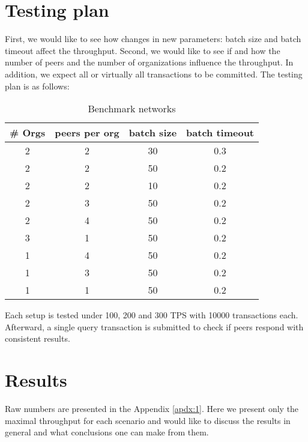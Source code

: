 \section{Testing plan}\label{sec:testplan}

First, we would like to see how changes in new parameters: batch size and batch timeout affect the throughput. Second, we would like to see if and how the number of peers and the number of organizations influence the throughput. In addition, we expect all or virtually all transactions to be committed. The testing plan is as follows:

\begin{table}[h!]
\begin{center}
\begin{tabular}{ c|c|c|c }
  \# Orgs & peers per org & batch size & batch timeout \\
 \hline
 \hline
 2 & 2 & 30 & 0.3 \\
 \hline
 2 & 2 & 50 & 0.2 \\
 \hline
 2 & 2 & 10 & 0.2 \\
 \hline
 2 & 3 & 50 & 0.2 \\
 \hline
 2 & 4 & 50 & 0.2 \\
 \hline
 3 & 1 & 50 & 0.2 \\
 \hline
 1 & 4 & 50 & 0.2 \\
 \hline
 1 & 3 & 50 & 0.2 \\
 \hline
 1 & 1 & 50 & 0.2 \\
 \hline
\end{tabular}
\end{center}
\caption{Benchmark networks}
\label{table:setups}
\end{table}

Each setup is tested under 100, 200 and 300 TPS with 10000 transactions each. Afterward, a single query transaction is submitted to check if peers respond with consistent results.

\section{Results}\label{sec:testres}

Raw numbers are presented in the Appendix \ref{apdx:1}. Here we present only the maximal throughput for each scenario and would like to discuss the results in general and what conclusions one can make from them.

